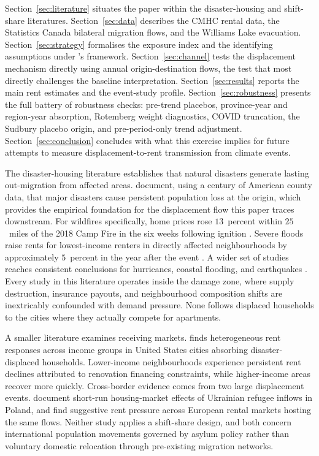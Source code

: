 \documentclass[12pt]{article}
\begin{document}
Section~\ref{sec:literature} situates the paper within the disaster-housing and
shift-share literatures. Section~\ref{sec:data} describes the CMHC rental data, the
Statistics Canada bilateral migration flows, and the Williams Lake evacuation.
Section~\ref{sec:strategy} formalises the exposure index and the identifying assumptions
under \citeauthor{goldsmith2020}'s framework. Section~\ref{sec:channel} tests the
displacement mechanism directly using annual origin-destination flows, the test that most
directly challenges the baseline interpretation. Section~\ref{sec:results} reports the
main rent estimates and the event-study profile. Section~\ref{sec:robustness} presents
the full battery of robustness checks: pre-trend placebos, province-year and region-year
absorption, Rotemberg weight diagnostics, COVID truncation, the Sudbury placebo origin,
and pre-period-only trend adjustment. Section~\ref{sec:conclusion} concludes with what
this exercise implies for future attempts to measure displacement-to-rent transmission
from climate events.
\fi %

The disaster-housing literature establishes that natural disasters generate
lasting out-migration from affected areas. \citet{boustan2020} document,
using a century of American county data, that major disasters cause persistent
population loss at the origin, which provides the empirical foundation for the
displacement flow this paper traces downstream. For wildfires specifically, home
prices rose $13$~percent within $25$~miles of the 2018 Camp Fire in the six
weeks following ignition \citep{hennighausen2024}. Severe floods raise rents for
lowest-income renters in directly affected neighbourhoods by approximately
$5$~percent in the year after the event \citep{brennan2024}. A wider set of
studies reaches consistent conclusions for hurricanes, coastal flooding, and
earthquakes \citep{Vigdor2008, GallagherHartley2017, OrtegaTaspinar2018}.
Every study in this literature operates inside the damage zone, where supply
destruction, insurance payouts, and neighbourhood composition shifts are
inextricably confounded with demand pressure. None follows displaced households
to the cities where they actually compete for apartments.

A smaller literature examines receiving markets. \citet{harwood2026} finds
heterogeneous rent responses across income groups in United States cities
absorbing disaster-displaced households. Lower-income neighbourhoods experience
persistent rent declines attributed to renovation financing constraints, while
higher-income areas recover more quickly. Cross-border evidence comes
from two large displacement events. \citet{trojanek2022} document short-run
housing-market effects of Ukrainian refugee inflows in Poland, and
\citet{czerniak2024} find suggestive rent pressure across European rental markets
hosting the same flows. Neither study applies a shift-share design, and both
concern international population movements governed by asylum policy rather than
voluntary domestic relocation through pre-existing migration networks.
\end{document}
